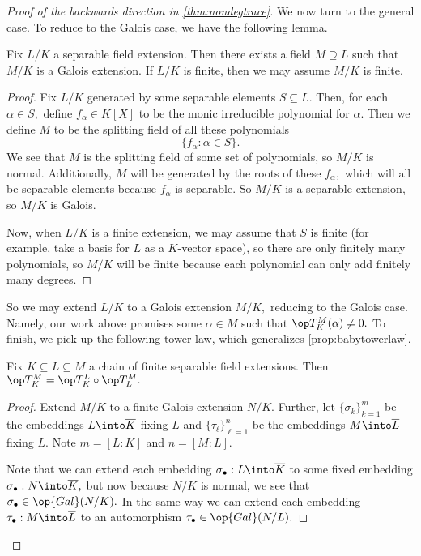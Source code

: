 \documentclass[../notes.tex]{subfiles}
\begin{document}
\begin{proof}[Proof of the backwards direction in \autoref{thm:nondegtrace}]
	We now turn to the general case. To reduce to the Galois case, we have the following lemma.
	\begin{lemma}
		Fix $L/K$ a separable field extension. Then there exists a field $M\supseteq L$ such that $M/K$ is a Galois extension. If $L/K$ is finite, then we may assume $M/K$ is finite.
	\end{lemma}
	\begin{proof}
		Fix $L/K$ generated by some separable elements $S\subseteq L.$ Then, for each $\alpha\in S,$ define $f_\alpha\in K[X]$ to be the monic irreducible polynomial for $\alpha.$ Then we define $M$ to be the splitting field of all these polynomials
		\[\{f_\alpha:\alpha\in S\}.\]
		We see that $M$ is the splitting field of some set of polynomials, so $M/K$ is normal. Additionally, $M$ will be generated by the roots of these $f_\alpha,$ which will all be separable elements because $f_\alpha$ is separable. So $M/K$ is a separable extension, so $M/K$ is Galois.

		Now, when $L/K$ is a finite extension, we may assume that $S$ is finite (for example, take a basis for $L$ as a $K$-vector space), so there are only finitely many polynomials, so $M/K$ will be finite because each polynomial can only add finitely many degrees.
	\end{proof}
	So we may extend $L/K$ to a Galois extension $M/K,$ reducing to the Galois case. Namely, our work above promises some $\alpha\in M$ such that $\op T^M_K(\alpha)\ne0.$ To finish, we pick up the following tower law, which generalizes \autoref{prop:babytowerlaw}.
	\begin{lemma} \label{lem:tracetower}
		Fix $K\subseteq L\subseteq M$ a chain of finite separable field extensions. Then $\op T^M_K=\op T^L_K\circ\op T^M_L.$
	\end{lemma}
	\begin{proof}
		Extend $M/K$ to a finite Galois extension $N/K.$ Further, let $\{\sigma_k\}_{k=1}^m$ be the embeddings $L\into\overline K$ fixing $L$ and $\{\tau_\ell\}_{\ell=1}^n$ be the embeddings $M\into\overline L$ fixing $L.$ Note $m=[L:K]$ and $n=[M:L].$
		
		Note that we can extend each embedding $\sigma_\bullet:L\into\overline K$ to some fixed embedding $\sigma_\bullet:N\into\overline K,$ but now because $N/K$ is normal, we see that $\sigma_\bullet\in\op{Gal}(N/K).$ In the same way we can extend each embedding $\tau_\bullet:M\into\overline L$ to an automorphism $\tau_\bullet\in\op{Gal}(N/L).$


\end{proof}
\end{proof}
\end{document}
